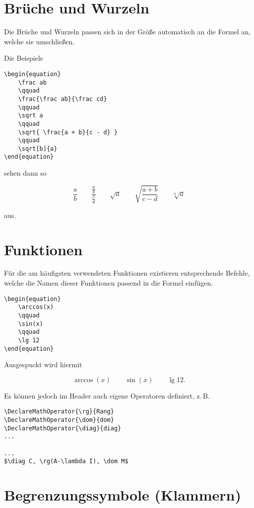 \section{Brüche und Wurzeln}

Die Brüche und Wurzeln passen sich in der Größe automatisch an die Formel an, welche sie umschließen.

Die Beispiele

\begin{lstlisting}
\begin{equation}
	\frac ab
	\qquad
	\frac{\frac ab}{\frac cd}
	\qquad
	\sqrt a
	\qquad
	\sqrt{ \frac{a + b}{c - d} }
	\qquad
	\sqrt[b]{a}
\end{equation}
\end{lstlisting} 

sehen dann so

\begin{equation}
	\frac ab
	\qquad
	\frac{\frac ab}{\frac cd}
	\qquad
	\sqrt a
	\qquad
	\sqrt{ \frac{a + b}{c - d} }
	\qquad
	\sqrt[b]{a}
\end{equation}

aus.

\section{Funktionen}

Für die am häufigsten verwendeten Funktionen existieren entsprechende Befehle, welche die Namen dieser Funktionen passend in die Formel einfügen.

\begin{lstlisting}
\begin{equation}
	\arccos(x)
	\qquad
	\sin(x)
	\qquad
	\lg 12
\end{equation}
\end{lstlisting} 

Ausgespuckt wird hiermit

\begin{equation}
	\arccos(x)
	\qquad
	\sin(x)
	\qquad
	\lg 12.
\end{equation}

Es können jedoch im Header auch eigene Operatoren definiert, z.\,B.
\begin{lstlisting}
\DeclareMathOperator{\rg}{Rang}
\DeclareMathOperator{\dom}{dom}
\DeclareMathOperator{\diag}{diag}
...

...
$\diag C, \rg(A-\lambda I), \dom M$
\end{lstlisting}

\section{Begrenzungssymbole (Klammern)}

